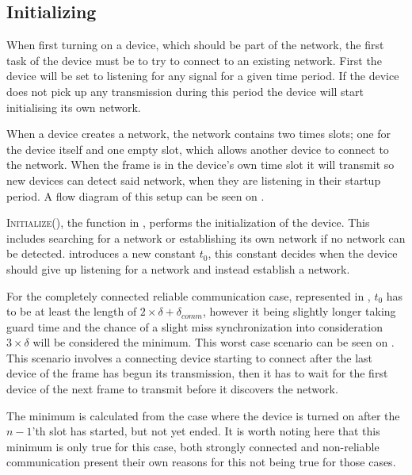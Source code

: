 \subsection{Initializing} %
\label{sub:setupCCRC} 
When first turning on a device, which should be part of the network, the first task of the device must be to try to connect to an existing network.
First the device will be set to listening for any signal for a given time period. 
If the device does not pick up any transmission during this period the device will start initialising its own network.

When a device creates a network, the network contains two times slots; one for the device itself and one empty slot, which allows another device to connect to the network.
When the frame is in the device's own time slot it will transmit so new devices can detect said network, when they are listening in their startup period.  
A flow diagram of this setup can be seen on .

 
\noindent
\textsc{Initialize()}, the function in , performs the initialization of the device.
This includes searching for a network or establishing its own network if no network can be detected.
 introduces a new constant $t_0$, this constant decides when the device should give up listening for a network and instead establish a network.

For the completely connected reliable communication case, represented in , $t_0$ has to be at least the length of $2 \times \delta + \delta_{comm}$, however it being slightly longer taking guard time and the chance of a slight miss synchronization into consideration $3 \times \delta$ will be considered the minimum. 
This worst case scenario can be seen on .
This scenario involves a connecting device starting to connect after the last device of the frame has begun its transmission, then it has to wait for the first device of the next frame to transmit before it discovers the network. 


\noindent%
The minimum is calculated from the case where the device is turned on after the $n-1$'th slot has started, but not yet ended.
It is worth noting here that this minimum is only true for this case, both strongly connected and non-reliable communication present their own reasons for this not being true for those cases.

